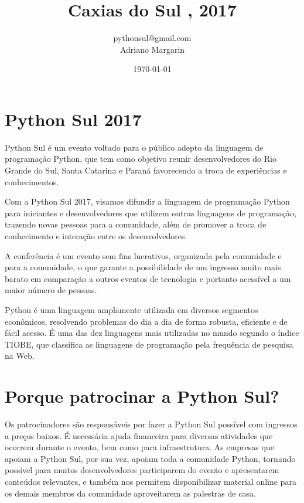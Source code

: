 \documentclass[12pt]{article}
\title{Caxias do Sul , 2017}
\author{pythonsul@gmail.com \\ Adriano Margarin}
\date{\today}
\begin{document}
\maketitle


\section{Python Sul 2017}

Python Sul é um evento voltado para o público adepto da linguagem de programação Python, que tem como objetivo reunir desenvolvedores do Rio Grande do Sul, Santa Catarina e Paraná favorecendo a troca de experiências e conhecimentos.

Com a Python Sul 2017, visamos difundir a linguagem de programação Python para iniciantes e desenvolvedores que utilizem outras linguagens de programação, trazendo novas pessoas para a comunidade, além de promover a troca de conhecimento e interação entre os desenvolvedores.

A conferência é um evento sem fins lucrativos, organizada pela comunidade e para a comunidade, o que garante a possibilidade de um ingresso muito mais barato em comparação a outros eventos de tecnologia e portanto acessível a um maior número de pessoas.

Python é uma linguagem amplamente utilizada em diversos segmentos econômicos, resolvendo problemas do dia a dia de forma robusta, eficiente e de fácil acesso. É uma das dez linguagens mais utilizadas no mundo segundo o índice TIOBE, que classifica as linguagens de programação pela frequência de pesquisa na Web.

\section{Porque patrocinar a Python Sul?}

Os patrocinadores são responsáveis por fazer a Python Sul possível com ingressos a preços baixos. É necessária ajuda financeira para diversas atividades que ocorrem durante o evento, bem como para infraestrutura. As empresas que apoiam a Python Sul, por sua vez, apoiam toda a comunidade Python, tornando possível para muitos desenvolvedores participarem do evento e apresentarem conteúdos relevantes, e também nos permitem disponibilizar material online para os demais membros da comunidade aproveitarem as palestras de casa.
\end{document}
